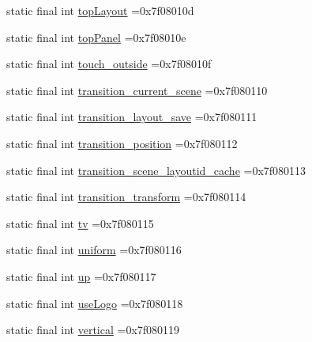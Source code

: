 \begin{DoxyCompactItemize}
\item 
static final int \mbox{\hyperlink{classcom_1_1example_1_1trainawearapplication_1_1_r_1_1id_ad218e0547e0b04f4acb7f312230188aa}{top\+Layout}} =0x7f08010d
\item 
static final int \mbox{\hyperlink{classcom_1_1example_1_1trainawearapplication_1_1_r_1_1id_ad170d83dc6c8b44e99ad69d6e301b2d2}{top\+Panel}} =0x7f08010e
\item 
static final int \mbox{\hyperlink{classcom_1_1example_1_1trainawearapplication_1_1_r_1_1id_a44e58c6b86baf9d7ee6d74f46c9ee1e8}{touch\+\_\+outside}} =0x7f08010f
\item 
static final int \mbox{\hyperlink{classcom_1_1example_1_1trainawearapplication_1_1_r_1_1id_ace1214861f4913873a875a3060e4fb9b}{transition\+\_\+current\+\_\+scene}} =0x7f080110
\item 
static final int \mbox{\hyperlink{classcom_1_1example_1_1trainawearapplication_1_1_r_1_1id_ae49568f59f11ea295e9d90e7bab9f804}{transition\+\_\+layout\+\_\+save}} =0x7f080111
\item 
static final int \mbox{\hyperlink{classcom_1_1example_1_1trainawearapplication_1_1_r_1_1id_a7db5a296f0f066e6598cf89c7eb09c2d}{transition\+\_\+position}} =0x7f080112
\item 
static final int \mbox{\hyperlink{classcom_1_1example_1_1trainawearapplication_1_1_r_1_1id_a9e1a23cdc8bf8a57d93bac006d1fc228}{transition\+\_\+scene\+\_\+layoutid\+\_\+cache}} =0x7f080113
\item 
static final int \mbox{\hyperlink{classcom_1_1example_1_1trainawearapplication_1_1_r_1_1id_a09558ce7ddbc3c90d598345cb3966000}{transition\+\_\+transform}} =0x7f080114
\item 
static final int \mbox{\hyperlink{classcom_1_1example_1_1trainawearapplication_1_1_r_1_1id_a7c4ee790f77ab553b120187d728240d6}{tv}} =0x7f080115
\item 
static final int \mbox{\hyperlink{classcom_1_1example_1_1trainawearapplication_1_1_r_1_1id_ab288b1f0b8613b56498a98379b168caf}{uniform}} =0x7f080116
\item 
static final int \mbox{\hyperlink{classcom_1_1example_1_1trainawearapplication_1_1_r_1_1id_a0189e0bd877b82691ccb8a713ae8cebd}{up}} =0x7f080117
\item 
static final int \mbox{\hyperlink{classcom_1_1example_1_1trainawearapplication_1_1_r_1_1id_a09770bf839d35bd3a16d4db282c3171d}{use\+Logo}} =0x7f080118
\item 
static final int \mbox{\hyperlink{classcom_1_1example_1_1trainawearapplication_1_1_r_1_1id_ac228299dd90ce1f01345df78f11104f3}{vertical}} =0x7f080119

\end{DoxyCompactItemize}
